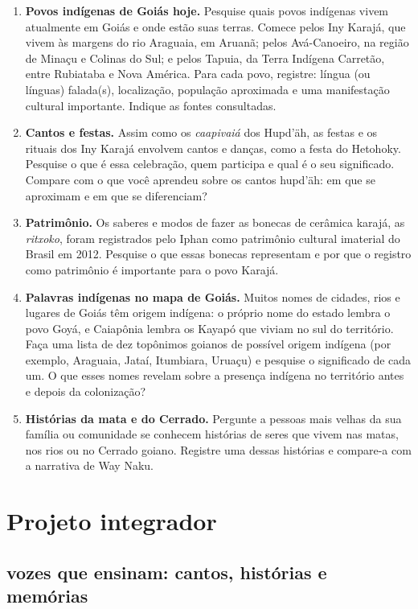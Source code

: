 \begin{enumerate}[label=\arabic*.]
\item \textbf{Povos indígenas de Goiás hoje.} Pesquise quais
povos indígenas vivem atualmente em Goiás e onde estão suas terras.
Comece pelos Iny Karajá, que vivem às margens do rio Araguaia, em
Aruanã; pelos Avá-Canoeiro, na região de Minaçu e Colinas do Sul; e
pelos Tapuia, da Terra Indígena Carretão, entre Rubiataba e Nova
América. Para cada povo, registre: língua (ou línguas) falada(s),
localização, população aproximada e uma manifestação cultural
importante. Indique as fontes consultadas.
\item \textbf{Cantos e festas.} Assim como os
\textit{caapivaiá} dos Hupd'äh, as festas e os rituais dos Iny Karajá
envolvem cantos e danças, como a festa do Hetohoky. Pesquise o que é
essa celebração, quem participa e qual é o seu significado. Compare com
o que você aprendeu sobre os cantos hupd'äh: em que se aproximam e em
que se diferenciam?
\item \textbf{Patrimônio.} Os saberes e modos de fazer as
bonecas de cerâmica karajá, as \textit{ritxoko}, foram registrados pelo
Iphan como patrimônio cultural imaterial do Brasil em 2012. Pesquise o
que essas bonecas representam e por que o registro como patrimônio é
importante para o povo Karajá.
\item \textbf{Palavras indígenas no mapa de Goiás.} Muitos
nomes de cidades, rios e lugares de Goiás têm origem indígena: o próprio
nome do estado lembra o povo Goyá, e Caiapônia lembra os Kayapó que
viviam no sul do território. Faça uma lista de dez topônimos goianos de
possível origem indígena (por exemplo, Araguaia, Jataí, Itumbiara,
Uruaçu) e pesquise o significado de cada um. O que esses nomes revelam
sobre a presença indígena no território antes e depois da colonização?
\item \textbf{Histórias da mata e do Cerrado.} Pergunte a
pessoas mais velhas da sua família ou comunidade se conhecem histórias
de seres que vivem nas matas, nos rios ou no Cerrado goiano. Registre
uma dessas histórias e compare-a com a narrativa de Way Naku.
\end{enumerate}

\chapter{Projeto integrador}

\section{vozes que ensinam: cantos, histórias e memórias}

